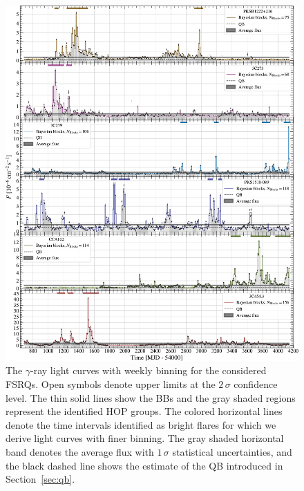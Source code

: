 \documentclass[twocolumn]{aastex62}
\newcommand{\gray}{$\gamma$-ray\xspace}
\begin{document}
\begin{figure}
    \centering
    \includegraphics[width = .9\linewidth]{lc_weekly_tsmin9.pdf}
    \caption{The \gray light curves with weekly binning for the considered FSRQs. Open symbols denote upper limits at the $2\,\sigma$ confidence level. The thin solid lines show the BBs and the gray shaded regions represent the identified HOP groups. The colored horizontal lines denote the time intervals identified as bright flares for which we derive light curves with finer binning.
    The gray shaded horizontal band denotes the average flux with $1\,\sigma$ statistical uncertainties, and the black dashed line shows the estimate of the QB introduced in Section~\ref{sec:qb}.}
    \label{fig:weekly}
\end{figure}
\end{document}
